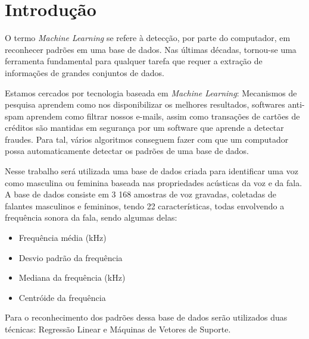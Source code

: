 \section{Introdução}
O termo \emph{Machine Learning} se refere à detecção, por parte do computador, em reconhecer padrões em uma base de dados.
Nas últimas décadas, tornou-se uma ferramenta fundamental para qualquer tarefa que requer a extração de informações de grandes conjuntos de dados. 

Estamos cercados por tecnologia baseada em \emph{Machine Learning}: Mecanismos de pesquisa aprendem como nos disponibilizar os melhores resultados, softwares anti-spam aprendem como filtrar nossos e-mails, assim como transações de cartões de créditos são mantidas em segurança por um software que aprende a detectar fraudes. \cite{shalev2014understanding}
Para tal, vários algoritmos conseguem fazer com que um computador possa automaticamente detectar os padrões de uma base de dados. 

Nesse trabalho será utilizada uma base de dados criada para identificar uma voz como masculina ou feminina baseada nas propriedades acústicas da voz e da fala. A base de dados consiste em 3 168 amostras de voz gravadas, coletadas de falantes masculinos e femininos, tendo 22 características, todas envolvendo a frequência sonora da fala, sendo algumas delas:

\begin{itemize}
	\item Frequência média (kHz)
	\item Desvio padrão da frequência
	\item Mediana da frequência (kHz)
	\item Centróide da frequência 
\end{itemize}

Para o reconhecimento dos padrões dessa base de dados serão utilizados duas técnicas: Regressão Linear e Máquinas de Vetores de Suporte.




